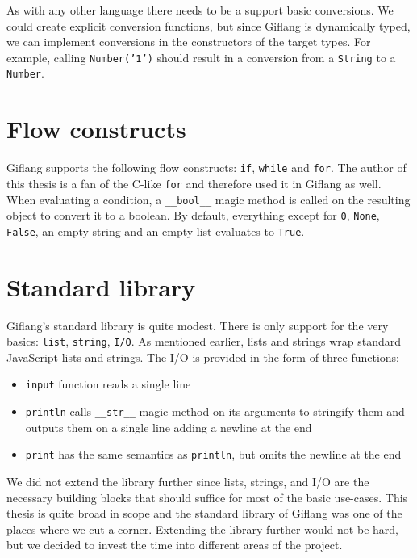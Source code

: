 As with any other language there needs to be a support basic conversions. We could create explicit conversion functions, but since Giflang is dynamically typed, we can
implement conversions in the constructors of the target types. For example, calling \texttt{Number('1')} should result in a conversion from a \texttt{String} to
a \texttt{Number}.

\section{Flow constructs}
Giflang supports the following flow constructs: \texttt{if}, \texttt{while} and \texttt{for}. The author of this thesis is a fan of the C-like \texttt{for} and therefore
used it in Giflang as well. When evaluating a condition, a \texttt{\_\_bool\_\_} magic method is called on the resulting object to convert it to a boolean. By default,
everything except for \texttt{0}, \texttt{None}, \texttt{False}, an empty string and an empty list evaluates to \texttt{True}.

\section{Standard library}
Giflang's standard library is quite modest. There is only support for the very basics: \texttt{list}, \texttt{string}, \texttt{I/O}. As mentioned earlier, lists
and strings wrap standard JavaScript lists and strings. The I/O is provided in the form of three functions:
\begin{itemize}
    \item \texttt{input} function reads a single line
    \item \texttt{println} calls \texttt{\_\_str\_\_} magic method on its arguments to stringify them and outputs them on a single line adding a newline at the end
    \item \texttt{print} has the same semantics as \texttt{println}, but omits the newline at the end
\end{itemize}

We did not extend the library further since lists, strings, and I/O are the necessary building blocks that should suffice for most of the basic use-cases.
This thesis is quite broad in scope and the standard library of Giflang was one of the places where we cut a corner. Extending the library further would not
be hard, but we decided to invest the time into different areas of the project.